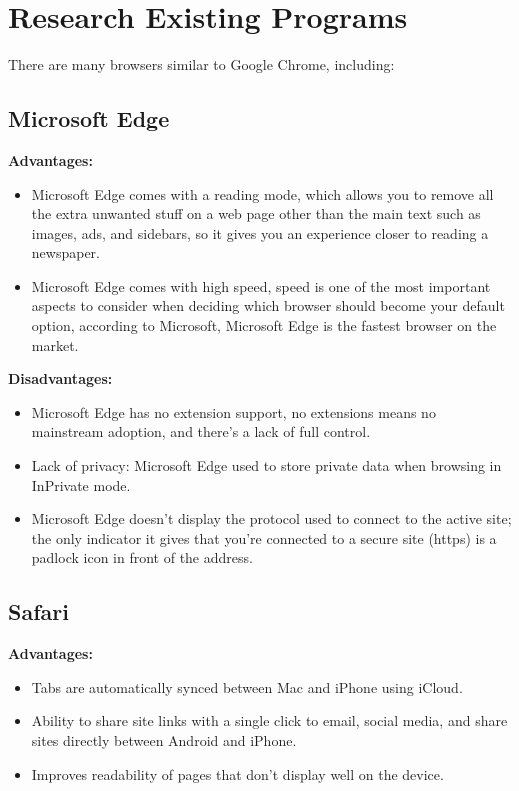 \documentclass[a4paper,12pt]{article}
\begin{document}
\section{Research Existing Programs}
There are many browsers similar to Google Chrome, including:

\subsection{Microsoft Edge}
\textbf{Advantages:}
\begin{itemize}
    \item Microsoft Edge comes with a reading mode, which allows you to remove all the extra unwanted stuff on a web page other than the main text such as images, ads, and sidebars, so it gives you an experience closer to reading a newspaper.
    \item Microsoft Edge comes with high speed, speed is one of the most important aspects to consider when deciding which browser should become your default option, according to Microsoft, Microsoft Edge is the fastest browser on the market.
\end{itemize}

\textbf{Disadvantages:}
\begin{itemize}
    \item Microsoft Edge has no extension support, no extensions means no mainstream adoption, and there’s a lack of full control.
    \item Lack of privacy: Microsoft Edge used to store private data when browsing in InPrivate mode.
    \item Microsoft Edge doesn’t display the protocol used to connect to the active site; the only indicator it gives that you’re connected to a secure site (https) is a padlock icon in front of the address.
\end{itemize}

\subsection{Safari}
\textbf{Advantages:}
\begin{itemize}
    \item Tabs are automatically synced between Mac and iPhone using iCloud.
    \item Ability to share site links with a single click to email, social media, and share sites directly between Android and iPhone.
    \item Improves readability of pages that don’t display well on the device.
\end{itemize}
\end{document}
